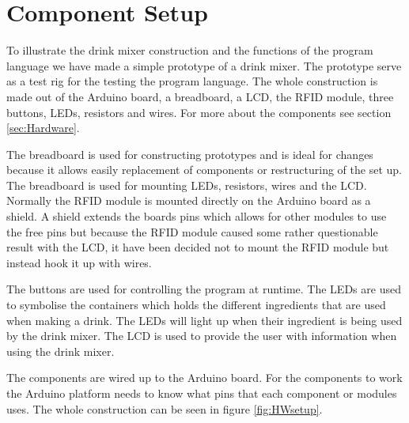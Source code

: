 \section{Component Setup}
To illustrate the drink mixer construction and the functions of the program language we have made a simple prototype of a drink mixer. The prototype serve as a test rig for the testing the program language. The whole construction is made out of the Arduino board, a breadboard, a LCD, the RFID module, three buttons, LEDs, resistors and wires. For more about the components see section \ref{sec:Hardware}.

The breadboard is used for constructing prototypes and is ideal for changes because it allows easily replacement of components or restructuring of the set up. The breadboard is used for mounting LEDs, resistors, wires and the LCD.
Normally the RFID module is mounted directly on the Arduino board as a shield. A shield extends the boards pins which allows for other modules to use the free pins but because the RFID module caused some rather questionable result with the LCD, it have been decided not to mount the RFID module but instead hook it up with wires.

The buttons are used for controlling the program at runtime. The LEDs are used to symbolise the containers which holds the different ingredients that are used when making a drink. The LEDs will light up when their ingredient is being used by the drink mixer. The LCD is used to provide the user with information when using the drink mixer.


The components are wired up to the Arduino board. For the components to work the Arduino platform needs to know what pins that each component or modules uses. The whole construction can be seen in figure \ref{fig:HWsetup}.